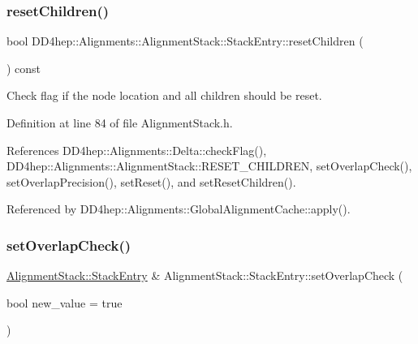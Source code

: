\subsubsection{\texorpdfstring{reset\+Children()}{resetChildren()}}
{\footnotesize\ttfamily bool D\+D4hep\+::\+Alignments\+::\+Alignment\+Stack\+::\+Stack\+Entry\+::reset\+Children (\begin{DoxyParamCaption}{ }\end{DoxyParamCaption}) const\hspace{0.3cm}{\ttfamily [inline]}}



Check flag if the node location and all children should be reset. 



Definition at line 84 of file Alignment\+Stack.\+h.



References D\+D4hep\+::\+Alignments\+::\+Delta\+::check\+Flag(), D\+D4hep\+::\+Alignments\+::\+Alignment\+Stack\+::\+R\+E\+S\+E\+T\+\_\+\+C\+H\+I\+L\+D\+R\+EN, set\+Overlap\+Check(), set\+Overlap\+Precision(), set\+Reset(), and set\+Reset\+Children().



Referenced by D\+D4hep\+::\+Alignments\+::\+Global\+Alignment\+Cache\+::apply().

\hypertarget{struct_d_d4hep_1_1_alignments_1_1_alignment_stack_1_1_stack_entry_aab3b64eec3b308f200667f95d1b60a16}{}\label{struct_d_d4hep_1_1_alignments_1_1_alignment_stack_1_1_stack_entry_aab3b64eec3b308f200667f95d1b60a16} 
\subsubsection{\texorpdfstring{set\+Overlap\+Check()}{setOverlapCheck()}}
{\footnotesize\ttfamily \hyperlink{struct_d_d4hep_1_1_alignments_1_1_alignment_stack_1_1_stack_entry}{Alignment\+Stack\+::\+Stack\+Entry} \& Alignment\+Stack\+::\+Stack\+Entry\+::set\+Overlap\+Check (\begin{DoxyParamCaption}\item[{bool}]{new\+\_\+value = {\ttfamily true} }\end{DoxyParamCaption})}




